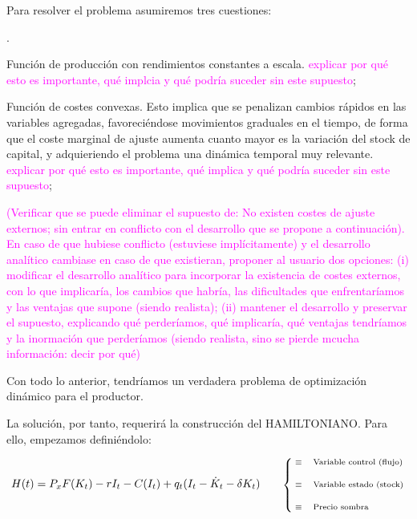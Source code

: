 \documentclass[10pt,a4paper]{article}
\newcounter{numitem}
\newenvironment{lnum}
      {\begin{list}{\arabic{numitem}.}{%
          \usecounter{numitem}%
          \setlength{\leftmargin}{1cm}%
          \setlength{\parskip}{3pt}%
          \setlength{\itemsep}{0pt}%
          \setlength{\parsep}{0pt}%
      }}
      {\end{list}}
\begin{document}
Para resolver el problema asumiremos tres cuestiones:
\begin{lnum}
    \item Función de producción con rendimientos constantes a escala. \textcolor{magenta}{explicar por qué esto es importante, qué implcia y qué podría suceder sin este supuesto};
    \item Función de costes convexas. Esto implica que se penalizan cambios rápidos en las variables agregadas, favoreciéndose movimientos graduales en el tiempo, de forma que el coste marginal de ajuste aumenta cuanto mayor es la variación del stock de capital, y adquieriendo el problema una dinámica temporal muy relevante. \textcolor{magenta}{explicar por qué esto es importante, qué implica y qué podría suceder sin este supuesto};
    \item \textcolor{magenta}{(Verificar que se puede eliminar el supuesto de: No existen costes de ajuste externos; sin entrar en conflicto con el desarrollo que se propone a continuación). En caso de que hubiese conflicto (estuviese implícitamente) y el desarrollo analítico cambiase en caso de que existieran, proponer al usuario dos opciones: (i) modificar el desarrollo analítico para incorporar la existencia de costes externos, con lo que implicaría, los cambios que habría, las dificultades que enfrentaríamos y las ventajas que supone (siendo realista); (ii) mantener el desarrollo y preservar el supuesto, explicando qué perderíamos, qué implicaría, qué ventajas tendríamos y la inormación que perderíamos (siendo realista, sino se pierde mcucha información: decir por qué)}
\end{lnum}


Con todo lo anterior, tendríamos un verdadera problema de optimización dinámico para el productor.

La solución, por tanto, requerirá la construcción del HAMILTONIANO. Para ello, empezamos definiéndolo:

$$\begin{aligned}
  H(t)=P_xF(K_t)-rI_t-C(I_t)+q_t(I_t-\dot K_t-\delta K_t)\qquad \text{\scriptsize $
    \left\{\begin{aligned}
        &\equiv&&\text{Variable control (flujo)}\\[1em]
        &\equiv&&\text{Variable estado (stock)}\\[1em]
        &\equiv&&\text{Precio sombra}
    \end{aligned}\right.$}
\end{aligned}$$
\end{document}
